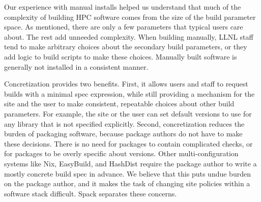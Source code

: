 Our experience with manual installs helped us understand that much of the complexity
of building HPC software comes from the size of the build parameter space.
As mentioned, there are only a few parameters that typical users care about.
The rest add unneeded complexity.  When building manually, LLNL staff
tend to make arbitrary choices about the secondary build parameters,
or they add logic to build scripts to make these choices.
Manually built software is generally not installed in a consistent manner.

Concretization provides two benefits.  First, it allows users and staff to
request builds with a minimal spec expression, while still providing a
mechanism for the site and the user to make consistent, repeatable choices about
other build parameters.  For example, the site or the user can set default versions
to use for any library that is not specified explicitly.
%
Second, concretization reduces the burden of packaging software, because
package authors do not have to make these decisions.  There is no
need for packages to contain complicated checks, or for packages to be overly
specific about versions.  Other multi-configuration systems like Nix, EasyBuild,
and HashDist require the package author to write a mostly concrete build spec in advance.
We believe that this puts undue burden on the package author, and it makes the task
of changing site policies within a software stack difficult.  Spack
separates these concerns.
